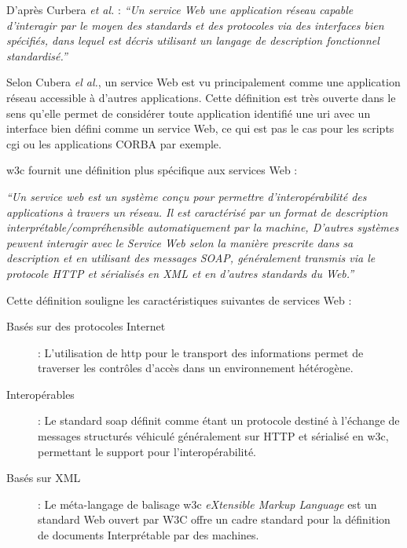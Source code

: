   D'après Curbera \emph{et al.} \cite{curbera2001web}: \textit{``Un
    service Web une application réseau capable d'interagir par le
    moyen des standards et des protocoles via des interfaces bien
    spécifiés, dans lequel est décris utilisant un langage de
    description fonctionnel standardisé.''}

  Selon Cubera \emph{el al.}, un service Web est vu principalement
  comme une application réseau accessible à d'autres
  applications. Cette définition est très ouverte dans le sens qu'elle
  permet de considérer toute application identifié une \acrshort{uri}
  avec un interface bien défini comme un service Web, ce qui est pas
  le cas pour les scripts \acrshort{cgi} ou les applications CORBA par
  exemple.

  \acrshort{w3c} fournit une définition plus spécifique aux services
  Web \cite{WSA}:

  \textit{``Un service web est un système conçu pour permettre
    d'interopérabilité des applications à travers un réseau.  Il est
    caractérisé par un format de description
    interprétable/compréhensible automatiquement par la machine,
    D'autres systèmes peuvent interagir avec le Service Web selon la
    manière prescrite dans sa description et en utilisant des messages
    SOAP, généralement transmis via le protocole HTTP et sérialisés en
    XML et en d'autres standards du Web.''}

  Cette définition souligne les caractéristiques suivantes de services
  Web \cite{fremantle2002enterprise}:

  \renewcommand{\descriptionlabel}[1]{\hspace{0.5cm}\textbullet~\textsf{#1}}
  \begin{description}
  \item[Basés sur des protocoles Internet]: L'utilisation de
    \acrshort{http} pour le transport des informations permet de
    traverser les contrôles d'accès dans un environnement hétérogène.

  \item[Interopérables]: Le standard \acrshort{soap}
    \cite{box2000simple} définit comme étant un protocole destiné à
    l'échange de messages structurés véhiculé généralement sur
    \textsc{HTTP} et sérialisé en \acrshort{w3c}, permettant le
    support pour l'interopérabilité.

  \item[Basés sur XML] : Le méta-langage de balisage \acrshort{w3c}
    \textit{eXtensible Markup Language} est un standard Web ouvert par
    \textsc{W3C} \cite{bray1998extensible} offre un cadre standard
    pour la définition de documents Interprétable par des machines.
  \end{description}
  \enddescription

